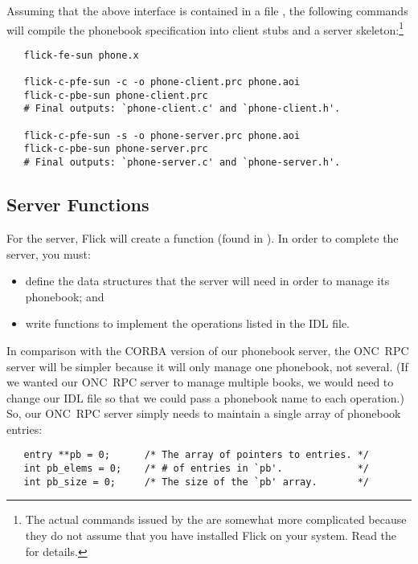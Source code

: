 Assuming that the above interface is contained in a file ,
the following commands will compile the phonebook specification into client
stubs and a server skeleton:\footnote{The actual commands issued by the
 are somewhat more complicated because they do not assume
that you have installed Flick on your system.  Read the  for
details.}

\begin{verbatim}
   flick-fe-sun phone.x

   flick-c-pfe-sun -c -o phone-client.prc phone.aoi
   flick-c-pbe-sun phone-client.prc
   # Final outputs: `phone-client.c' and `phone-client.h'.

   flick-c-pfe-sun -s -o phone-server.prc phone.aoi
   flick-c-pbe-sun phone-server.prc
   # Final outputs: `phone-server.c' and `phone-server.h'.
\end{verbatim}



\subsection{Server Functions}
\label{subsec:ONCRPC:Server Functions}

For the server, Flick will create a  function (found in
).  In order to complete the server, you must:

\begin{itemize}
  \item define the data structures that the server will need in order to manage
  its phonebook; and

  \item write functions to implement the operations listed in the IDL file.
\end{itemize}

In comparison with the CORBA version of our phonebook server, the ONC~RPC
server will be simpler because it will only manage one phonebook, not several.
(If we wanted our ONC~RPC server to manage multiple books, we would need to
change our IDL file so that we could pass a phonebook name to each operation.)
So, our ONC~RPC server simply needs to maintain a single array of phonebook
entries:

\begin{verbatim}
   entry **pb = 0;      /* The array of pointers to entries. */
   int pb_elems = 0;    /* # of entries in `pb'.             */
   int pb_size = 0;     /* The size of the `pb' array.       */
\end{verbatim}

